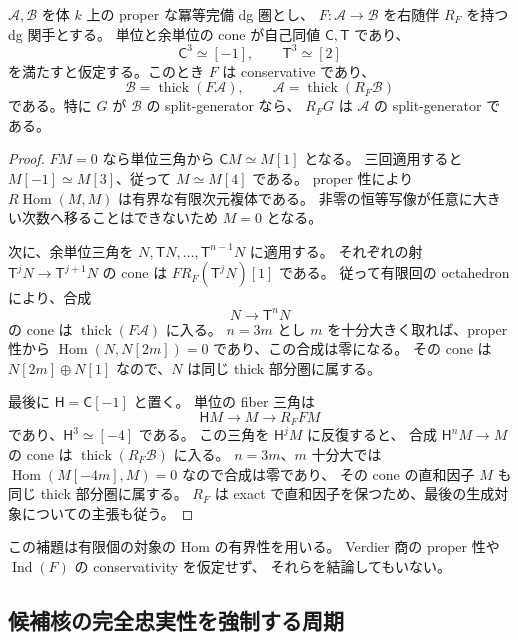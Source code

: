 \begin{lemma}
\label{cmo:lem:periodic-spherical-generation}
$\mathcal A,\mathcal B$ を体 $k$ 上の proper な冪等完備 dg 圏とし、
$F:\mathcal A\to\mathcal B$ を右随伴 $R_F$ を持つ dg 関手とする。
単位と余単位の cone が自己同値 $\mathsf C,\mathsf T$ であり、
\[
 \mathsf C^3\simeq[-1],\qquad\mathsf T^3\simeq[2]
\]
を満たすと仮定する。このとき $F$ は conservative であり、
\begin{equation}
\label{cmo:eq:spherical-two-generations}
 \mathcal B=\operatorname{thick}(F\mathcal A),
 \qquad
 \mathcal A=\operatorname{thick}(R_F\mathcal B)
\end{equation}
である。特に $G$ が $\mathcal B$ の split-generator なら、
$R_FG$ は $\mathcal A$ の split-generator である。
\end{lemma}

\begin{proof}
$FM=0$ なら単位三角から $\mathsf C M\simeq M[1]$ となる。
三回適用すると $M[-1]\simeq M[3]$、従って $M\simeq M[4]$ である。
proper 性により $R\operatorname{Hom}(M,M)$ は有界な有限次元複体である。
非零の恒等写像が任意に大きい次数へ移ることはできないため $M=0$ となる。

次に、余単位三角を $N,\mathsf T N,\ldots,\mathsf T^{n-1}N$ に適用する。
それぞれの射 $\mathsf T^jN\to\mathsf T^{j+1}N$ の cone は
$F R_F(\mathsf T^jN)[1]$ である。
従って有限回の octahedron により、合成
\[
 N\longrightarrow\mathsf T^nN
\]
の cone は $\operatorname{thick}(F\mathcal A)$ に入る。
$n=3m$ とし $m$ を十分大きく取れば、proper 性から
$\operatorname{Hom}(N,N[2m])=0$ であり、この合成は零になる。
その cone は $N[2m]\oplus N[1]$ なので、$N$ は同じ thick 部分圏に属する。

最後に $\mathsf H=\mathsf C[-1]$ と置く。
単位の fiber 三角は
\[
 \mathsf H M\longrightarrow M\longrightarrow R_F FM
\]
であり、$\mathsf H^3\simeq[-4]$ である。
この三角を $\mathsf H^jM$ に反復すると、
合成 $\mathsf H^nM\to M$ の cone は
$\operatorname{thick}(R_F\mathcal B)$ に入る。
$n=3m$、$m$ 十分大では
$\operatorname{Hom}(M[-4m],M)=0$ なので合成は零であり、
その cone の直和因子 $M$ も同じ thick 部分圏に属する。
$R_F$ は exact で直和因子を保つため、最後の生成対象についての主張も従う。
\end{proof}

この補題は有限個の対象の Hom の有界性を用いる。
Verdier 商の proper 性や $\operatorname{Ind}(F)$ の conservativity を仮定せず、
それらを結論してもいない。

\subsection{候補核の完全忠実性を強制する周期}

